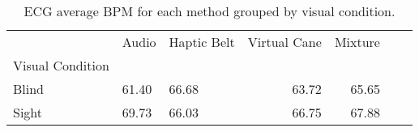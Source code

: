
\begin{table}[!htb]
\centering
\caption{ECG average BPM for each method grouped by visual condition.}
\label{tab:bpm_average_group_noBase}
\begin{tabular}{lllrrrr}
\toprule
{} &  Audio & Haptic Belt & Virtual Cane & Mixture \\
Visual Condition &        &             &              &         \\
\midrule
Blind            &  61.40 &       66.68 &        63.72 &   65.65 \\
Sight            &  69.73 &       66.03 &        66.75 &   67.88 \\
\bottomrule
\end{tabular}
\end{table}

